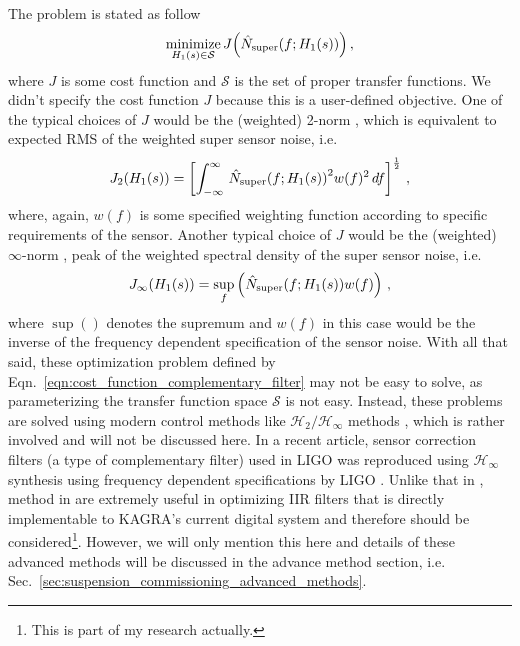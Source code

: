 The problem is stated as follow
\begin{equation}
	\minimize_{H_1(s)\in\mathcal{S}} J\mleft(\hat{N}_\mathrm{super}\mleft(f; H_1(s)\mright)\mright)\,,
	\label{eqn:cost_function_complementary_filter}
\end{equation}
where $J$ is some cost function and $\mathcal{S}$ is the set of proper transfer functions.
We didn't specify the cost function $J$ because this is a user-defined objective.
One of the typical choices of $J$ would be the (weighted) 2-norm \cite{norms_for_signals_and_systems}, which is equivalent to expected RMS of the weighted super sensor noise, i.e.
\begin{equation}
	J_2\mleft(H_1(s)\mright) = \left[\int_{-\infty}^\infty \, \hat{N}_\mathrm{super}\mleft(f;H_1(s)\mright)^2 w(f)^2\, df\right]^\frac{1}{2}\,,
	\label{eqn:cost_function_super_sensor_noise_rms}
\end{equation}
where, again, $w(f)$ is some specified weighting function according to specific requirements of the sensor.
Another typical choice of $J$ would be the (weighted) $\infty$-norm \cite{norms_for_signals_and_systems}, peak of the weighted spectral density of the super sensor noise, i.e.
\begin{equation}
	J_\infty\mleft(H_1(s)\mright) = \sup_{f} \left(\hat{N}_\mathrm{super}\mleft(f;H_1(s)\mright)w(f) \right) \,,
\end{equation}
where $\sup()$ denotes the supremum and $w(f)$ in this case would be the inverse of the frequency dependent specification of the sensor noise.
With all that said, these optimization problem defined by Eqn.~\eqref{eqn:cost_function_complementary_filter} may not be easy to solve, as parameterizing the transfer function space $\mathcal{S}$ is not easy.
Instead, these problems are solved using modern control methods like $\mathcal{H}_2/\mathcal{H}_\infty$ methods \cite{feedback_control_theory}, which is rather involved and will not be discussed here.
In a recent article, sensor correction filters (a type of complementary filter) used in LIGO \cite{low_frequency_vibration_isolation_hua} was reproduced using $\mathcal{H}_\infty$ synthesis using frequency dependent specifications by LIGO \cite{complementary_filters_shaping_using_h_infinity_synthesis}.
Unlike that in \cite{low_frequency_vibration_isolation_hua}, method in \cite{complementary_filters_shaping_using_h_infinity_synthesis} are extremely useful in optimizing IIR filters that is directly implementable to KAGRA's current digital system and therefore should be considered\footnote{This is part of my research actually.}.
However, we will only mention this here and details of these advanced methods will be discussed in the advance method section, i.e. Sec.~\ref{sec:suspension_commissioning_advanced_methods}.

